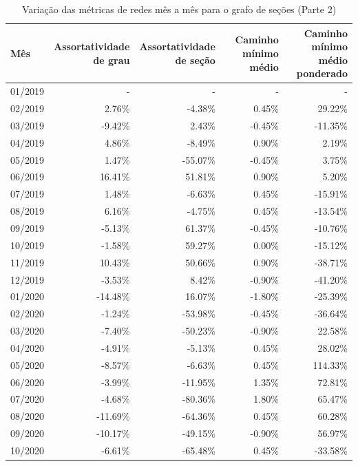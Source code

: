 \begin{table}[htb]
\centering
\caption{Variação das métricas de redes mês a mês para o grafo de seções (Parte 2)}
\label{tab:metricas-redes-pandemia:grafo-mensal-por-secao2}
\begin{tabular}{l|rrrr}
\toprule
Mês & \shortstack{Assortatividade\\de grau} & \shortstack{Assortatividade\\de seção} & \shortstack{Caminho mínimo\\médio} & \shortstack{Caminho mínimo\\médio ponderado} \\
\midrule
01/2019 &  - &  - &  - &  - \\
02/2019 &   2.76\% &  -4.38\% &  0.45\% &  29.22\% \\
03/2019 &  -9.42\% &   2.43\% & -0.45\% & -11.35\% \\
04/2019 &   4.86\% &  -8.49\% &  0.90\% &   2.19\% \\
05/2019 &   1.47\% & -55.07\% & -0.45\% &   3.75\% \\
06/2019 &  16.41\% &  51.81\% &  0.90\% &   5.20\% \\
07/2019 &   1.48\% &  -6.63\% &  0.45\% & -15.91\% \\
08/2019 &   6.16\% &  -4.75\% &  0.45\% & -13.54\% \\
09/2019 &  -5.13\% &  61.37\% & -0.45\% & -10.76\% \\
10/2019 &  -1.58\% &  59.27\% &  0.00\% & -15.12\% \\
11/2019 &  10.43\% &  50.66\% &  0.90\% & -38.71\% \\
12/2019 &  -3.53\% &   8.42\% & -0.90\% & -41.20\% \\
01/2020 & -14.48\% &  16.07\% & -1.80\% & -25.39\% \\
02/2020 &  -1.24\% & -53.98\% & -0.45\% & -36.64\% \\
03/2020 &  -7.40\% & -50.23\% & -0.90\% &  22.58\% \\
04/2020 &  -4.91\% &  -5.13\% &  0.45\% &  28.02\% \\
05/2020 &  -8.57\% &  -6.63\% &  0.45\% & 114.33\% \\
06/2020 &  -3.99\% & -11.95\% &  1.35\% &  72.81\% \\
07/2020 &  -4.68\% & -80.36\% &  1.80\% &  65.47\% \\
08/2020 & -11.69\% & -64.36\% &  0.45\% &  60.28\% \\
09/2020 & -10.17\% & -49.15\% & -0.90\% &  56.97\% \\
10/2020 &  -6.61\% & -65.48\% &  0.45\% & -33.58\% \\
\bottomrule
\end{tabular}
\fdadospesquisa
\end{table}

